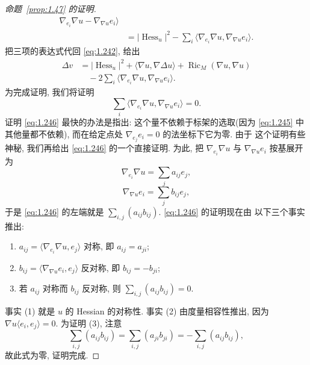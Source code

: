 \begin{proof}[命题~\ref{prop:1.47} 的证明]
\begin{equation}
\begin{aligned}
 \nabla_{e_i}\nabla u-\nabla_{\nabla u}e_i\bigr\rangle\\
&=|\operatorname{Hess}_u|^{2}
 -\sum_i\bigl\langle\nabla_{e_i}\nabla u,\nabla_{\nabla u}e_i\bigr\rangle.
\end{aligned}
\label{eq:1.244}
\end{equation}
把三项的表达式代回 \eqref{eq:1.242}, 给出
\begin{equation}
\begin{aligned}
\Delta v&=|\operatorname{Hess}_u|^{2}
 +\langle\nabla u,\nabla\Delta u\rangle
 +\operatorname{Ric}_M(\nabla u,\nabla u)\\
&\quad-2\sum_i
 \bigl\langle\nabla_{e_i}\nabla u,\nabla_{\nabla u}e_i\bigr\rangle.
\end{aligned}
\label{eq:1.245}
\end{equation}
为完成证明, 我们将证明
\begin{equation}
\sum_i\bigl\langle\nabla_{e_i}\nabla u,\nabla_{\nabla u}e_i\bigr\rangle=0.
\label{eq:1.246}
\end{equation}
证明 \eqref{eq:1.246} 最快的办法是指出: 这个量不依赖于标架的选取(因为 \eqref{eq:1.245} 中
其他量都不依赖), 而在给定点处 $\nabla_{e_j}e_i=0$ 的法坐标下它为零. 由于
这个证明有些神秘, 我们再给出 \eqref{eq:1.246} 的一个直接证明. 为此, 把
$\nabla_{e_i}\nabla u$ 与 $\nabla_{\nabla u}e_i$ 按基展开为
\begin{equation}
\nabla_{e_i}\nabla u=\sum_j a_{ij}e_j,
\label{eq:1.247}
\end{equation}
\begin{equation}
\nabla_{\nabla u}e_i=\sum_j b_{ij}e_j,
\label{eq:1.248}
\end{equation}
于是 \eqref{eq:1.246} 的左端就是 $\sum_{i,j}(a_{ij}b_{ij})$. \eqref{eq:1.246} 的证明现在由
以下三个事实推出:
\begin{enumerate}
  \item $a_{ij}=\langle\nabla_{e_i}\nabla u,e_j\rangle$ 对称, 即
    $a_{ij}=a_{ji}$;
  \item $b_{ij}=\langle\nabla_{\nabla u}e_i,e_j\rangle$ 反对称, 即
    $b_{ij}=-b_{ji}$;
  \item 若 $a_{ij}$ 对称而 $b_{ij}$ 反对称, 则
    $\sum_{i,j}(a_{ij}b_{ij})=0$.
\end{enumerate}
事实 (1) 就是 $u$ 的 Hessian 的对称性. 事实 (2) 由度量相容性推出, 因为
$\nabla u\langle e_i,e_j\rangle=0$. 为证明 (3), 注意
\begin{equation}
\sum_{i,j}(a_{ij}b_{ij})=\sum_{i,j}(a_{ji}b_{ji})
 =-\sum_{i,j}(a_{ij}b_{ij}),
\label{eq:1.249}
\end{equation}
故此式为零, 证明完成.
\end{proof}
